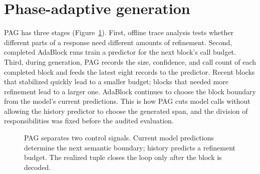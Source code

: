 \documentclass{article}
\newcommand{\pag}{PAG}
\begin{document}
\section{Phase-adaptive generation}
\label{sec:method}

\pag{} has three stages (Figure~\ref{fig:pipeline}). First, offline trace analysis tests whether different parts of a response need different amounts of refinement. Second, completed AdaBlock runs train a predictor for the next block's call budget. Third, during generation, PAG records the size, confidence, and call count of each completed block and feeds the latest eight records to the predictor. Recent blocks that stabilized quickly lead to a smaller budget; blocks that needed more refinement lead to a larger one. AdaBlock continues to choose the block boundary from the model's current predictions. This is how PAG cuts model calls without allowing the history predictor to choose the generated span, and the division of responsibilities was fixed before the audited evaluation.

\begin{figure}[t]
  \centering
  \caption{\pag{} separates two control signals. Current model predictions determine the next semantic boundary; history predicts a refinement budget. The realized tuple closes the loop only after the block is decoded.}
  \label{fig:pipeline}
\end{figure}
\end{document}
